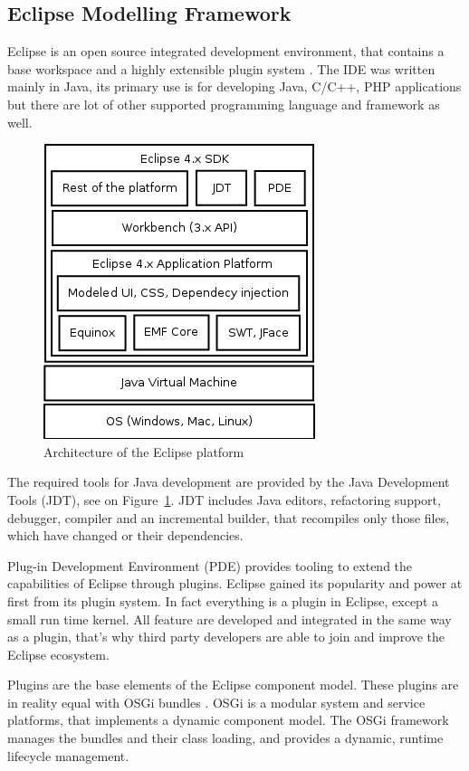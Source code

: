 \subsection{Eclipse Modelling Framework}
\label{sub:emf}

Eclipse is an open source integrated development environment, that contains a base workspace and a highly extensible plugin system \cite{aosa}. The IDE was written mainly in Java, its primary use is for developing Java, C/C++, PHP applications but there are lot of other supported programming language and framework as well.

\begin{figure}[htp]
\centering
\includegraphics[scale=0.5]{figures/design_eclipse.png}
\caption{Architecture of the Eclipse platform \cite{emf}}
\label{fig:designeclipse}
\end{figure}

The required tools for Java development are provided by the Java Development Tools (JDT), see on Figure~\ref{fig:designeclipse}. JDT includes Java editors, refactoring support, debugger, compiler and an incremental builder, that recompiles only those files, which have changed or their dependencies.

Plug-in Development Environment (PDE) provides tooling to extend the capabilities of Eclipse through plugins. Eclipse gained its popularity and power at first from its plugin system. In fact everything is a plugin in Eclipse, except a small run time kernel. All feature are developed and integrated in the same way as a plugin, that's why third party developers are able to join and improve the Eclipse ecosystem.

Plugins are the base elements of the Eclipse component model. These plugins are in reality equal with OSGi bundles \cite{osgi}. OSGi is a modular system and service platforms, that implements a dynamic component model. The OSGi framework manages the bundles and their class loading, and provides a dynamic, runtime lifecycle management.

